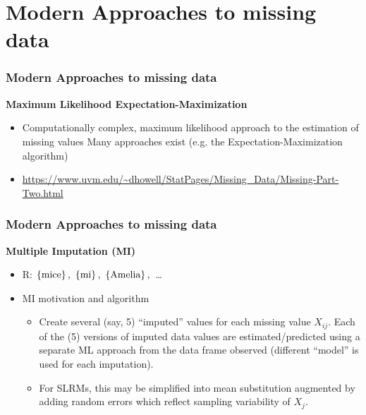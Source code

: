 \documentclass{beamer}
\begin{document}
\section{Modern Approaches to missing data}
\begin{frame}
\frametitle{Modern Approaches to missing data}

\textbf{Maximum Likelihood Expectation-Maximization}
  \begin{itemize}
  \item Computationally complex, maximum likelihood approach to the estimation of missing values Many approaches exist (e.g. the Expectation-Maximization algorithm)
  \item[] \scriptsize{\url{https://www.uvm.edu/~dhowell/StatPages/Missing_Data/Missing-Part-Two.html}}
   \end{itemize}
 
\end{frame}




\begin{frame}
\frametitle{Modern Approaches to missing data}

\textbf{Multiple Imputation (MI) }
  \begin{itemize}
  \item[] R: $\left\lbrace \textnormal{mice}  \right\rbrace , \,\, \left\lbrace \textnormal{mi}  \right\rbrace, \,\, \left\lbrace \textnormal{Amelia}  \right\rbrace, \, $ \dots
  \vspace{0.5cm}
  \item[] MI motivation and algorithm
  \vspace{0.2cm}
  \begin{itemize}
  \item Create several (say, 5) “imputed” values for each missing value $X_{ij}$. Each of the (5) versions of imputed data values are estimated/predicted using a separate ML approach from the data frame observed (different “model” is used for each imputation).
  \vspace{0.2cm}
  \item For SLRMs, this may be simplified into mean substitution augmented by adding random errors which reflect sampling variability of $X_j$.
  \end{itemize}
 \end{itemize}
 
\end{frame}
\end{document}
